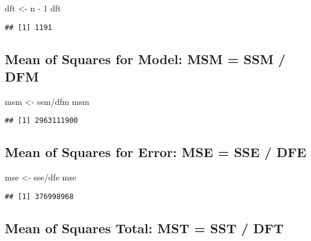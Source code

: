 \documentclass[
]{article}
\newenvironment{Shaded}{\begin{snugshade}}{\end{snugshade}}
\newcommand{\DecValTok}[1]{\textcolor[rgb]{0.00,0.00,0.81}{#1}}
\newcommand{\NormalTok}[1]{#1}
\newcommand{\OtherTok}[1]{\textcolor[rgb]{0.56,0.35,0.01}{#1}}
\newcommand{\SpecialCharTok}[1]{\textcolor[rgb]{0.00,0.00,0.00}{#1}}
\begin{document}
\begin{Shaded}
\begin{Highlighting}[]
\NormalTok{dft }\OtherTok{\textless{}{-}}\NormalTok{ n }\SpecialCharTok{{-}} \DecValTok{1}
\NormalTok{dft}
\end{Highlighting}
\end{Shaded}

\begin{verbatim}
## [1] 1191
\end{verbatim}

\hypertarget{mean-of-squares-for-model-msm-ssm-dfm}{%
\subsection{Mean of Squares for Model: MSM = SSM /
DFM}\label{mean-of-squares-for-model-msm-ssm-dfm}}

\begin{Shaded}
\begin{Highlighting}[]
\NormalTok{msm }\OtherTok{\textless{}{-}}\NormalTok{ ssm}\SpecialCharTok{/}\NormalTok{dfm}
\NormalTok{msm}
\end{Highlighting}
\end{Shaded}

\begin{verbatim}
## [1] 2963111900
\end{verbatim}

\hypertarget{mean-of-squares-for-error-mse-sse-dfe}{%
\subsection{Mean of Squares for Error: MSE = SSE /
DFE}\label{mean-of-squares-for-error-mse-sse-dfe}}

\begin{Shaded}
\begin{Highlighting}[]
\NormalTok{mse }\OtherTok{\textless{}{-}}\NormalTok{ sse}\SpecialCharTok{/}\NormalTok{dfe}
\NormalTok{mse}
\end{Highlighting}
\end{Shaded}

\begin{verbatim}
## [1] 376998968
\end{verbatim}

\hypertarget{mean-of-squares-total-mst-sst-dft}{%
\subsection{Mean of Squares Total: MST = SST /
DFT}\label{mean-of-squares-total-mst-sst-dft}}
\end{document}
